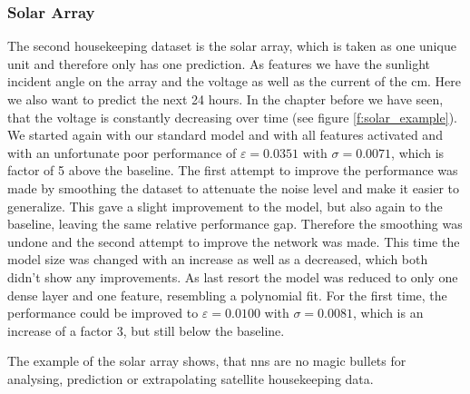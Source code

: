 		\subsubsection{Solar Array}
		The second housekeeping dataset is the solar array, which is taken as one unique unit and therefore only has one prediction. \newline
		As features we have the sunlight incident angle on the array and the voltage as well as the current of the \ac{cm}. Here we also want to predict the next 24 hours.  In the chapter before we have seen, that the voltage is constantly decreasing over time (see figure \ref{f:solar_example}). We started again with our standard model and with all features activated and with an unfortunate poor performance of $\varepsilon = 0.0351$ with $\sigma = 0.0071$, which is factor of 5 above the baseline. The first attempt to improve the performance was made by smoothing the dataset to attenuate the noise level and make it easier to generalize. This gave a slight improvement to the model, but also again to the baseline, leaving the same relative performance gap. \newline
		Therefore the smoothing was undone and the second attempt to improve the network was made. This time the model size was changed with an increase as well as a decreased, which both didn't show any improvements. As last resort the model was reduced to only one dense layer and one feature, resembling a polynomial fit. For the first time, the performance could be improved to $\varepsilon = 0.0100$ with $\sigma = 0.0081$, which is an increase of a factor 3, but still below the baseline.
		
		The example of the solar array shows, that \acp{nn} are no magic bullets for analysing, prediction or extrapolating satellite housekeeping data.